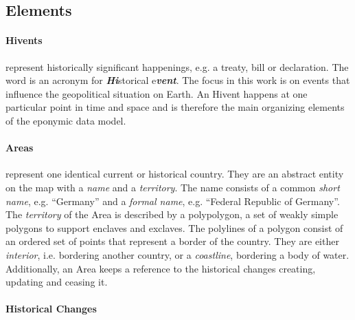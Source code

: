 \subsection{Elements} %
\label{sub:elements}

\vspace{-1em}
\paragraph{Hivents} %
\label{par:hivent}

represent historically significant happenings, e.g. a treaty, bill or declaration.
The word is an acronym for \emph{\textbf{Hi}}storical e\emph{\textbf{vent}}.
The focus in this work is on events that influence the geopolitical situation on Earth.
An Hivent happens at one particular point in time and space and is therefore the main organizing elements of the eponymic data model.


\vspace{-1em}
\paragraph{Areas} %
\label{par:area}

represent one identical current or historical country. They are an abstract entity on the map with a \emph{name} and a \emph{territory}. The name consists of a common \emph{short name}, e.g. ``Germany'' and a \emph{formal name}, e.g. ``Federal Republic of Germany''. The \emph{territory} of the Area is described by a polypolygon, a set of weakly simple polygons to support enclaves and exclaves. The polylines of a polygon consist of an ordered set of points that represent a border of the country. They are either \emph{interior}, i.e. bordering another country, or a \emph{coastline}, bordering a body of water. Additionally, an Area keeps a reference to the historical changes creating, updating and ceasing it.


\vspace{-1em}
\paragraph{Historical Changes} %
\label{par:historical_changes}

